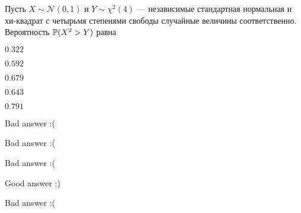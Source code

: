 
\begin{question}
Пусть \(X\sim\mathcal{N}(0,1)\) и \(Y\sim\chi^{2}(4)\) --- независимые
стандартная нормальная и хи-квадрат с четырьмя степенями свободы
случайные величины соответственно. Вероятность \(\P(X^2>Y)\) равна
\begin{answerlist}
  \item \(0.322\)
  \item \(0.592\)
  \item \(0.679\)
  \item \(0.643\)
  \item \(0.791\)
\end{answerlist}
\end{question}

\begin{solution}
\begin{answerlist}
  \item Bad answer :(
  \item Bad answer :(
  \item Bad answer :(
  \item Good answer :)
  \item Bad answer :(
\end{answerlist}
\end{solution}

